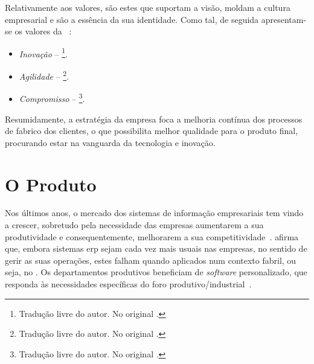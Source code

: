 Relativamente aos valores, são estes que suportam a visão, moldam a cultura empresarial e são a essência da sua identidade. Como tal, de seguida apresentam-se os valores da {\companyname}~\parencite{cmf_strategy}:

\begin{itemize}
    \item 
    {
        \textit{Inovação} -- \footnote{Tradução livre do autor. No original .}.
    }
    \item
    {
        \textit{Agilidade} -- \footnote{Tradução livre do autor. No original .}.
    }
    \item
    {
        \textit{Compromisso} -- \footnote{Tradução livre do autor. No original .}.
    }
\end{itemize}

Resumidamente, a estratégia da empresa foca a melhoria contínua dos processos de fabrico dos clientes, o que possibilita melhor qualidade para o produto final, procurando estar na vanguarda da tecnologia e inovação.

\section{O Produto}
\label{sec:chap02_product}
Nos últimos anos, o mercado dos sistemas de informação empresariais tem vindo a crescer, sobretudo pela necessidade das empresas aumentarem a sua produtividade e consequentemente, melhorarem a sua competitividade~\parencite{mes_literature_review}. \textcite{mes_literature_review} afirma que, embora sistemas \gls{erp} sejam cada vez mais usuais nas empresas, no sentido de gerir as suas operações, estes falham quando aplicados num contexto fabril, ou seja, no . Os departamentos produtivos beneficiam de \textit{software} personalizado, que responda às necessidades específicas do foro produtivo/industrial~\parencite{mes_literature_review}.

